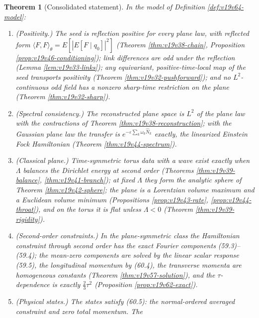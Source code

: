 \documentclass[11pt]{article}
\newtheorem{theorem}{Theorem}[section]
\theoremstyle{remark}
\begin{document}
\begin{theorem}[Consolidated statement]
\label{thm:v19v64-consolidated}
In the model of Definition \ref{def:v19v64-model}:
\begin{enumerate}
\item \textup{(Positivity.)}  The seed is reflection positive for every
      plane law, with reflected form
      \(\langle F,F\rangle_\theta=E[|E[F\mid q_0]|^2]\)
      (Theorem \ref{thm:v19v38-chain}, Proposition
      \ref{prop:v19v46-conditioning}); link differences are odd under
      the reflection (Lemma \ref{lem:v19v33-links}); any equivariant,
      positive-time-local map of the seed transports positivity
      (Theorem \ref{thm:v19v32-pushforward}); and no \(L^2\)-continuous
      odd field has a nonzero sharp-time restriction on the plane
      (Theorem \ref{thm:v19v32-sharp}).
\item \textup{(Spectral consistency.)}  The reconstructed plane space is
      \(L^2\) of the plane law with the contractions of Theorem
      \ref{thm:v19v38-reconstruction}; with the Gaussian plane law the
      transfer is \(e^{-\varepsilon\sum_k\omega_k\widehat N_k}\) exactly,
      the linearized Einstein Fock Hamiltonian (Theorem
      \ref{thm:v19v44-spectrum}).
\item \textup{(Classical plane.)}  Time-symmetric torus data with a
      wave exist exactly when \(\Lambda\) balances the Dirichlet energy
      at second order (Theorems \ref{thm:v19v39-balance},
      \ref{thm:v19v41-branch}); at fixed \(\Lambda\) they form the
      analytic sphere of Theorem \ref{thm:v19v42-sphere}; the plane is
      a Lorentzian volume maximum and a Euclidean volume minimum
      (Propositions \ref{prop:v19v43-rate}, \ref{prop:v19v44-throat}),
      and on the torus it is flat unless \(\Lambda<0\) (Theorem
      \ref{thm:v19v39-rigidity}).
\item \textup{(Second-order constraints.)}  In the plane-symmetric class
      the Hamiltonian constraint through second order has the exact
      Fourier components (59.3)--(59.4); the mean-zero components are
      solved by the linear scalar response (59.5), the longitudinal
      momentum by (60.4), the transverse momenta are homogeneous
      constants (Theorem \ref{thm:v19v57-solution}), and the
      \(\tau\)-dependence is exactly \(\tfrac23\tau^2\) (Proposition
      \ref{prop:v19v62-exact}).
\item \textup{(Physical states.)}  The states satisfy (60.5): the
      normal-ordered averaged constraint and zero total momentum.  The

\end{enumerate}
\end{theorem}
\end{document}
